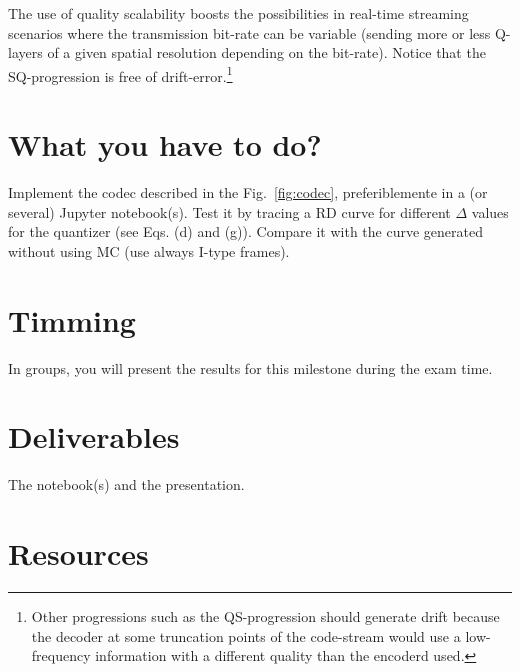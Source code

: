 The use of quality scalability boosts the possibilities in real-time
streaming scenarios where the transmission bit-rate can be variable
(sending more or less Q-layers of a given spatial resolution depending
on the bit-rate). Notice that the SQ-progression is free of
drift-error.\footnote{Other progressions such as the QS-progression
  should generate drift because the decoder at some truncation points
  of the code-stream would use a low-frequency information with a
  different quality than the encoderd used.}



\section{What you have to do?}

Implement the codec described in the Fig.~\ref{fig:codec},
preferiblemente in a (or several) Jupyter notebook(s). Test it by
tracing a RD curve for different $\Delta$ values for the quantizer
(see Eqs. (d) and (g)). Compare it with the curve generated without
using MC (use always I-type frames).

\section{Timming}

In groups, you will present the results for this milestone during the
exam time.

\section{Deliverables}

The notebook(s) and the presentation.

\section{Resources}

\renewcommand{\addcontentsline}[3]{}%

